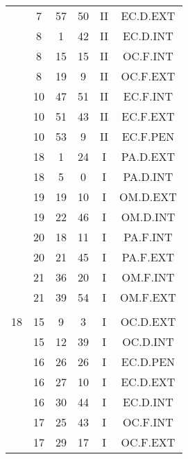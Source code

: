 \documentclass[12pt, a4paper]{article}
\begin{document}
\begin{multicols}{3}
{\begin{tabular}{c c c c c c}
	 	 	 	 & 7 & 57 & 50 & II & EC.D.EXT\\%
	 	 	 	 & 8 & 1 & 42 & II & EC.D.INT\\%
	 	 	 	 & 8 & 15 & 15 & II & OC.F.INT\\%
	 	 	 	 & 8 & 19 & 9 & II & OC.F.EXT\\%
	 	 	 	 & 10 & 47 & 51 & II & EC.F.INT\\%
	 	 	 	 & 10 & 51 & 43 & II & EC.F.EXT\\%
	 	 	 	 & 10 & 53 & 9 & II & EC.F.PEN\\%
	 	 	 	 & 18 & 1 & 24 & I & PA.D.EXT\\%
	 	 	 	 & 18 & 5 & 0 & I & PA.D.INT\\%
	 	 	 	 & 19 & 19 & 10 & I & OM.D.EXT\\%
	 	 	 	 & 19 & 22 & 46 & I & OM.D.INT\\%
	 	 	 	 & 20 & 18 & 11 & I & PA.F.INT\\%
	 	 	 	 & 20 & 21 & 45 & I & PA.F.EXT\\%
	 	 	 	 & 21 & 36 & 20 & I & OM.F.INT\\%
	 	 	 	 & 21 & 39 & 54 & I & OM.F.EXT\\%
	 	 	 	 & & & & & \\%
	 	 	 	18 & 15 & 9 & 3 & I & OC.D.EXT\\%
	 	 	 	 & 15 & 12 & 39 & I & OC.D.INT\\%
	 	 	 	 & 16 & 26 & 26 & I & EC.D.PEN\\%
	 	 	 	 & 16 & 27 & 10 & I & EC.D.EXT\\%
	 	 	 	 & 16 & 30 & 44 & I & EC.D.INT\\%
	 	 	 	 & 17 & 25 & 43 & I & OC.F.INT\\%
	 	 	 	 & 17 & 29 & 17 & I & OC.F.EXT\\%

\end{tabular}}
\end{multicols}
\end{document}
